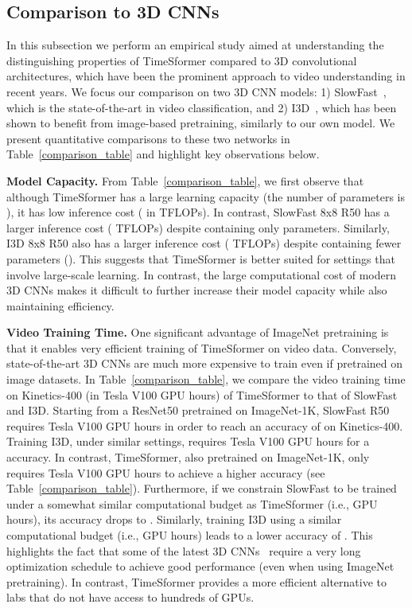 \documentclass{article}
\begin{document}
\subsection{Comparison to 3D CNNs}
\label{comparison_sec}

In this subsection we perform an empirical study aimed at understanding the distinguishing properties of TimeSformer compared to 3D convolutional architectures, which have been the prominent approach to video understanding in recent years. We focus our comparison on two 3D CNN models: 1) SlowFast~\cite{slowfast}, which is the state-of-the-art in video classification, and 2) I3D~\cite{DBLP:conf/cvpr/CarreiraZ17}, which has been shown to benefit from image-based pretraining, similarly to our own model. We present quantitative comparisons to these two networks in Table~\ref{comparison_table} and highlight key observations below.

\textbf{Model Capacity.} From Table~\ref{comparison_table}, we first observe that although TimeSformer has a large learning capacity (the number of parameters is ), it has low inference cost ( in TFLOPs).  In contrast, SlowFast 8x8 R50 has a larger inference cost ( TFLOPs) despite containing only  parameters. Similarly, I3D 8x8 R50 also has a larger inference cost ( TFLOPs) despite containing fewer parameters (). This suggests that TimeSformer is better suited for settings that involve large-scale learning. In contrast, the large computational cost of modern 3D CNNs makes it difficult to further increase their model capacity while also maintaining efficiency.

\textbf{Video Training Time.} One significant advantage of ImageNet pretraining is that it enables very efficient training of TimeSformer on video data. Conversely, state-of-the-art 3D CNNs are much more expensive to train even if pretrained on image datasets. In Table~\ref{comparison_table}, we compare the video training time on Kinetics-400 (in Tesla V100 GPU hours) of TimeSformer to that of SlowFast and I3D. Starting from a ResNet50 pretrained on ImageNet-1K, SlowFast  R50 requires  Tesla V100 GPU hours in order to reach an accuracy of  on Kinetics-400. Training I3D, under similar settings, requires  Tesla V100 GPU hours for a  accuracy. In contrast, TimeSformer, also pretrained on ImageNet-1K, only requires  Tesla V100 GPU hours to achieve a higher  accuracy (see Table~\ref{comparison_table}). Furthermore, if we constrain SlowFast to be trained under a somewhat similar computational budget as TimeSformer (i.e.,  GPU hours), its accuracy drops to . Similarly, training I3D using a similar computational budget (i.e.,  GPU hours) leads to a lower accuracy of . This highlights the fact that some of the latest 3D CNNs~\cite{slowfast,feichtenhofer2020x3d} require a very long optimization schedule to achieve good performance (even when using ImageNet pretraining). In contrast, TimeSformer provides a more efficient alternative to labs that do not have access to hundreds of GPUs.
\end{document}
